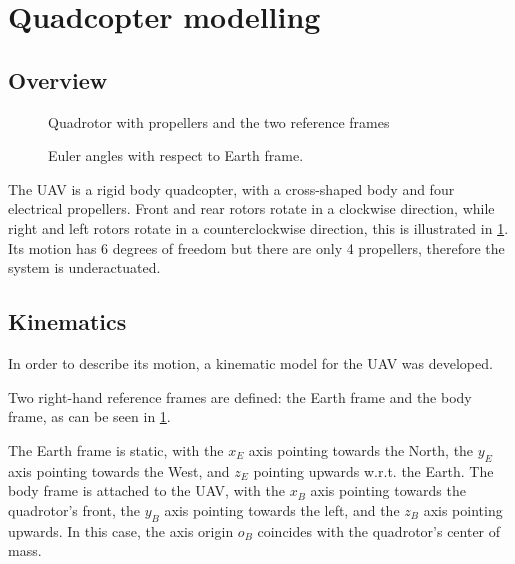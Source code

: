 \documentclass[journal]{IEEEtran}
\begin{document}
	\section{Quadcopter modelling}
	\subsection{Overview}
	\begin{figure}
		\centering
		
		\caption{Quadrotor with propellers and the two reference frames}
		\label{fig:frames_rotors}
	\end{figure}
	
	\begin{figure}
		\centering
		
		\caption{Euler angles with respect to Earth frame.}
		\label{fig:roll_pitch_yaw}
	\end{figure}
	
	The UAV is a rigid body quadcopter, with a cross-shaped body and four electrical propellers. Front and rear rotors rotate in a clockwise direction, while right and left rotors rotate in a counterclockwise direction, this is illustrated in \figurename \ref{fig:frames_rotors}. Its motion has 6 degrees of freedom but there are only 4 propellers, therefore the system is underactuated. 
	
	\subsection{Kinematics}
	In order to describe its motion, a kinematic model for the UAV was developed.
	
	Two right-hand reference frames are defined: the Earth frame and the body frame, as can be seen in \figurename{\ref{fig:frames_rotors}}. 
	
	The Earth frame is static, with the $x_E$ axis pointing towards the North, the $y_E$ axis pointing towards the West, and $z_E$ pointing upwards w.r.t. the Earth. The body frame is attached to the UAV, with the $x_B$ axis pointing towards the quadrotor's front, the $y_B$ axis pointing towards the left, and the $z_B$ axis pointing upwards. In this case, the axis origin $o_B$ coincides with the quadrotor's center of mass.
	
\end{document}
